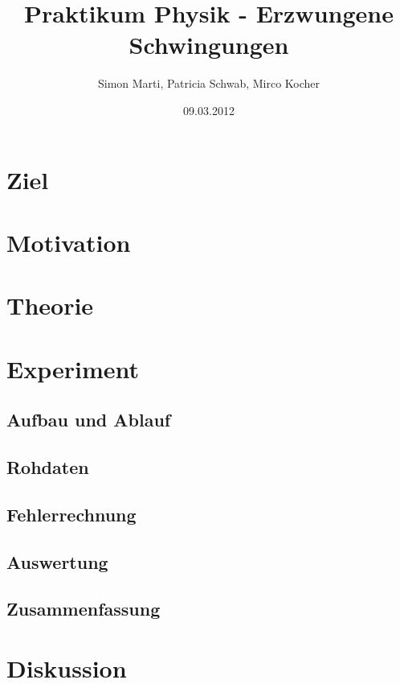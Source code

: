 \documentclass[12pt,a4paper]{article}
\title{Praktikum Physik - Erzwungene Schwingungen}
\author{Simon Marti, Patricia Schwab, Mirco Kocher}
\date{09.03.2012}
\begin{document}
\maketitle

\section*{Ziel}


\section*{Motivation}


\section*{Theorie}


\section*{Experiment}

\subsection*{Aufbau und Ablauf}

\subsection*{Rohdaten}

\subsection*{Fehlerrechnung}

\subsection*{Auswertung}

\subsection*{Zusammenfassung}


\section*{Diskussion}
\end{document}
